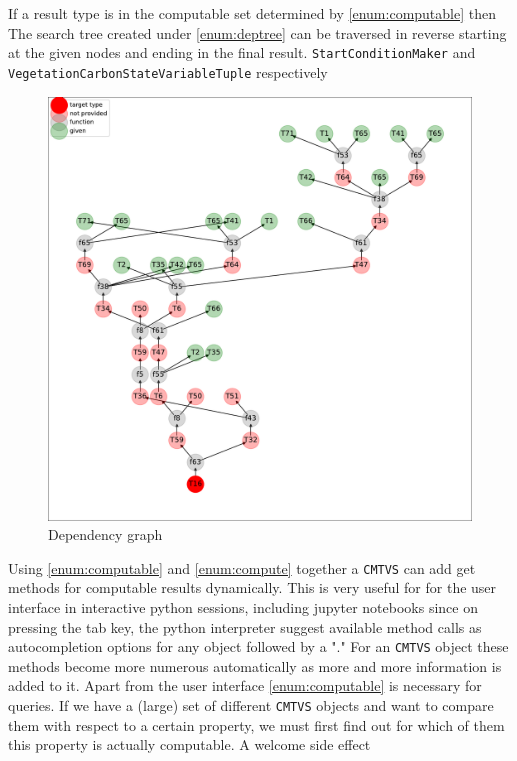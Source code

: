 \begin{enumerate}
  If a result type is in the computable set determined by \ref{enum:computable} then 
  The search tree created under \ref{enum:deptree} can be traversed in reverse starting
  at the given nodes and ending in the final result.
  \texttt{StartConditionMaker} and \texttt{VegetationCarbonStateVariableTuple} respectively 
\begin{figure}[h]
  \label{fig:dep_graph}
  \includegraphics[width=\textwidth]{dep_graph.pdf}
  \caption{ Dependency graph}
  {
    \small
    
  }  
\end{figure}  
\end{enumerate} 
Using \ref{enum:computable} and \ref{enum:compute} together a
\texttt{CMTVS} can add get methods for computable results dynamically.  This
is very useful for for the user interface in interactive python sessions,
including jupyter notebooks since on pressing the tab key, the python
interpreter suggest available method calls as autocompletion options for any
object followed by a "." For an \texttt{CMTVS} object these methods become
more numerous automatically as more and more information is added to it.
Apart from the user interface \ref{enum:computable} is necessary for queries.
If we have a (large) set of different \texttt{CMTVS} objects and want to
compare them with respect to a certain property, we must first find out for
which of them this property is actually computable.  A welcome side effect
